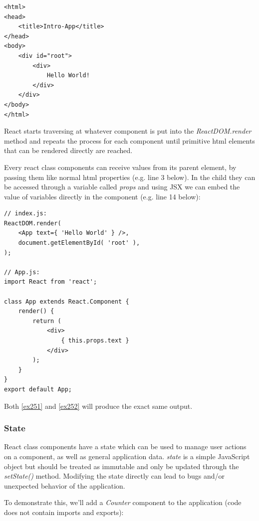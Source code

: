 \lstset{language=HTML}
\begin{lstlisting}[caption={Resulting HTML after building}]
<html> 
<head>
	<title>Intro-App</title>
</head>
<body>
	<div id="root">
		<div>
			Hello World!
		</div>
	</div>
</body>
</html>
\end{lstlisting}

React starts traversing at whatever component is put into the \emph{ReactDOM.render} method and repeats the process for each component until primitive html elements that can be rendered directly are reached.

Every react class components can receive values from its parent element, by passing them like normal html properties (e.g. line 3 below). In the child they can be accessed through a variable called \emph{props} and using JSX we can embed the value of variables directly in the component (e.g. line 14 below):

\lstset{language=JavaScript}
\begin{lstlisting}[caption={Using Props},label={ex252}]
// index.js:
ReactDOM.render(
	<App text={ 'Hello World' } />,
	document.getElementById( 'root' ),
);

// App.js:
import React from 'react';

class App extends React.Component {
	render() {
		return (
			<div>
				{ this.props.text }
			</div>
		);
	}
}
export default App;
\end{lstlisting}
Both \autoref{ex251} and \autoref{ex252} will produce the exact same output.

\subsubsection{State}
React class components have a state which can be used to manage user actions on a component, as well as general application data. \emph{state} is a simple JavaScript object but should be treated as immutable and only be updated through the \emph{setState()} method. Modifying the state directly can lead to bugs and/or unexpected behavior of the application.

To demonstrate this, we'll add a \emph{Counter} component to the application (code does not contain imports and exports):


